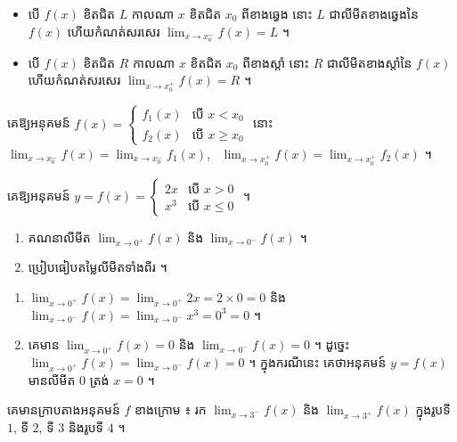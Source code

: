 \begin{formulaBox}[ជាទូទៅ]
\begin{itemize}
  \item បើ $f(x)$ ខិតជិត $L$ កាលណា $x$ ខិតជិត $x_0$ ពីខាងឆ្វេង នោះ $L$ ជាលីមីតខាងឆ្វេងនៃ $f(x)$ ហើយកំណត់សរសេរ $\displaystyle\lim_{x \to x_0^-} f(x) = L$ ។
  \item បើ $f(x)$ ខិតជិត $R$ កាលណា $x$ ខិតជិត $x_0$ ពីខាងស្ដាំ នោះ $R$ ជាលីមីតខាងស្ដាំនៃ $f(x)$ ហើយកំណត់សរសេរ $\displaystyle\lim_{x \to x_0^+} f(x) = R$ ។
\end{itemize}
\end{formulaBox}

\begin{note}[សម្គាល់]
គេឱ្យអនុគមន៍ $f(x) = \begin{cases} f_1(x) & \text{បើ } x < x_0\\ f_2(x) & \text{បើ } x \ge x_0 \end{cases}$ នោះ $\displaystyle\lim_{x \to x_0^-} f(x) = \lim_{x \to x_0^-} f_1(x)$, \ $\displaystyle\lim_{x \to x_0^+} f(x) = \lim_{x \to x_0^+} f_2(x)$ ។
\end{note}

\begin{example}[លំហាត់គំរូ ១]
គេឱ្យអនុគមន៍ $y = f(x) = \begin{cases} 2x & \text{បើ } x > 0\\ x^3 & \text{បើ } x \le 0 \end{cases}$ ។
\begin{enumerate}[a]
  \item គណនាលីមីត $\displaystyle\lim_{x \to 0^+} f(x)$ និង $\displaystyle\lim_{x \to 0^-} f(x)$ ។
  \item ប្រៀបធៀបតម្លៃលីមីតទាំងពីរ ។
\end{enumerate}
\end{example}
\ans
\begin{enumerate}[a]
  \item $\displaystyle\lim_{x \to 0^+} f(x) = \lim_{x \to 0^+} 2x = 2\times 0 = 0$ និង $\displaystyle\lim_{x \to 0^-} f(x) = \lim_{x \to 0^-} x^3 = 0^3 = 0$ ។
  \item គេមាន $\displaystyle\lim_{x \to 0^+} f(x) = 0$ និង $\displaystyle\lim_{x \to 0^-} f(x) = 0$ ។ ដូច្នេះ $\displaystyle\lim_{x \to 0^+} f(x) = \lim_{x \to 0^-} f(x) = 0$ ។ ក្នុងករណីនេះ គេថាអនុគមន៍ $y = f(x)$ មានលីមីត $0$ ត្រង់ $x = 0$ ។
\end{enumerate}

\begin{example}[លំហាត់គំរូ ២]
គេមានក្រាបតាងអនុគមន៍ $f$ ខាងក្រោម ៖ រក $\displaystyle\lim_{x \to 3^-} f(x)$ និង $\displaystyle\lim_{x \to 3^+} f(x)$ ក្នុងរូបទី $1$, ទី $2$, ទី $3$ និងរូបទី $4$ ។
\end{example}

